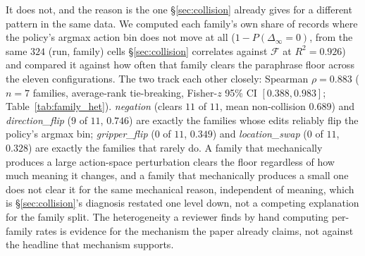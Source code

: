It does not, and the reason is the one \S\ref{sec:collision} already gives for a different pattern in the same data. We computed each family's own share of records where the policy's argmax action bin does not move at all ($1 - P(\Delta_\infty{=}0)$, from the same $324$ (run, family) cells \S\ref{sec:collision} correlates against $\mathcal{F}$ at $R^2{=}0.926$) and compared it against how often that family clears the paraphrase floor across the eleven configurations. The two track each other closely: Spearman $\rho = 0.883$ ($n{=}7$ families, average-rank tie-breaking, Fisher-$z$ 95\% CI $[0.388, 0.983]$; Table~\ref{tab:family_het}). \emph{negation} (clears $11$ of $11$, mean non-collision $0.689$) and \emph{direction\_flip} ($9$ of $11$, $0.746$) are exactly the families whose edits reliably flip the policy's argmax bin; \emph{gripper\_flip} ($0$ of $11$, $0.349$) and \emph{location\_swap} ($0$ of $11$, $0.328$) are exactly the families that rarely do. A family that mechanically produces a large action-space perturbation clears the floor regardless of how much meaning it changes, and a family that mechanically produces a small one does not clear it for the same mechanical reason, independent of meaning, which is \S\ref{sec:collision}'s diagnosis restated one level down, not a competing explanation for the family split. The heterogeneity a reviewer finds by hand computing per-family rates is evidence for the mechanism the paper already claims, not against the headline that mechanism supports.

